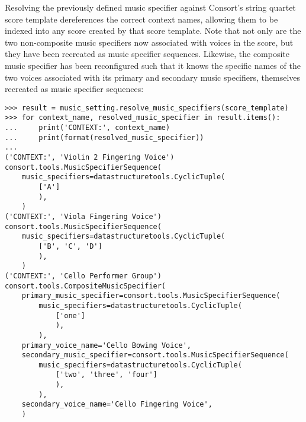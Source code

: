 \noindent Resolving the previously defined music specifier against Consort's
string quartet score template dereferences the correct context names, allowing
them to be indexed into any score created by that score template. Note that not
only are the two non-composite music specifiers now associated with voices in
the score, but they have been recreated as music specifier sequences. Likewise,
the composite music specifier has been reconfigured such that it knows the
specific names of the two voices associated with its primary and secondary
music specifiers, themselves recreated as music specifier sequences:

\begin{comment}
<abjad>
result = music_setting.resolve_music_specifiers(score_template)
for context_name, resolved_music_specifier in result.items():
    print('CONTEXT:', context_name)
    print(format(resolved_music_specifier))

</abjad>
\end{comment}

\begin{abjadbookoutput}
\begin{singlespacing}
\vspace{-0.5\baselineskip}
\begin{lstlisting}
>>> result = music_setting.resolve_music_specifiers(score_template)
>>> for context_name, resolved_music_specifier in result.items():
...     print('CONTEXT:', context_name)
...     print(format(resolved_music_specifier))
...
('CONTEXT:', 'Violin 2 Fingering Voice')
consort.tools.MusicSpecifierSequence(
    music_specifiers=datastructuretools.CyclicTuple(
        ['A']
        ),
    )
('CONTEXT:', 'Viola Fingering Voice')
consort.tools.MusicSpecifierSequence(
    music_specifiers=datastructuretools.CyclicTuple(
        ['B', 'C', 'D']
        ),
    )
('CONTEXT:', 'Cello Performer Group')
consort.tools.CompositeMusicSpecifier(
    primary_music_specifier=consort.tools.MusicSpecifierSequence(
        music_specifiers=datastructuretools.CyclicTuple(
            ['one']
            ),
        ),
    primary_voice_name='Cello Bowing Voice',
    secondary_music_specifier=consort.tools.MusicSpecifierSequence(
        music_specifiers=datastructuretools.CyclicTuple(
            ['two', 'three', 'four']
            ),
        ),
    secondary_voice_name='Cello Fingering Voice',
    )
\end{lstlisting}
\end{singlespacing}
\end{abjadbookoutput}

